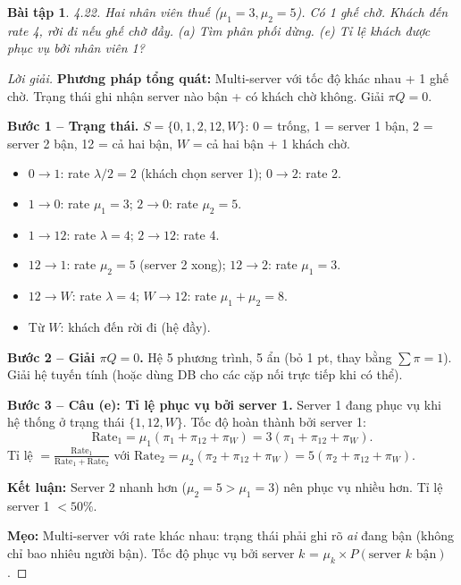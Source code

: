 \documentclass[8pt,a4paper]{article}
\newtheorem{exercise}{Bài tập}
\newenvironment{solution}{\begin{proof}[Lời giải]}{\end{proof}}
\begin{document}
\begin{exercise}
4.22. Hai nhân viên thuế ($\mu_1=3, \mu_2=5$). Có 1 ghế chờ. Khách đến rate 4, rời đi nếu ghế chờ đầy.
(a) Tìm phân phối dừng. (e) Tỉ lệ khách được phục vụ bởi nhân viên 1?
\end{exercise}
\begin{solution}
\textbf{Phương pháp tổng quát:} Multi-server với tốc độ khác nhau + 1 ghế chờ. Trạng thái ghi nhận server nào bận + có khách chờ không. Giải $\pi Q = 0$.

\textbf{Bước 1 -- Trạng thái.} $S = \{0, 1, 2, 12, W\}$: 0 = trống, 1 = server 1 bận, 2 = server 2 bận, 12 = cả hai bận, $W$ = cả hai bận + 1 khách chờ.
\begin{itemize}[nosep]
\item $0 \to 1$: rate $\lambda/2 = 2$ (khách chọn server 1); $0 \to 2$: rate 2.
\item $1 \to 0$: rate $\mu_1 = 3$; $2 \to 0$: rate $\mu_2 = 5$.
\item $1 \to 12$: rate $\lambda = 4$; $2 \to 12$: rate 4.
\item $12 \to 1$: rate $\mu_2 = 5$ (server 2 xong); $12 \to 2$: rate $\mu_1 = 3$.
\item $12 \to W$: rate $\lambda = 4$; $W \to 12$: rate $\mu_1 + \mu_2 = 8$.
\item Từ $W$: khách đến rời đi (hệ đầy).
\end{itemize}

\textbf{Bước 2 -- Giải $\pi Q = 0$.} Hệ 5 phương trình, 5 ẩn (bỏ 1 pt, thay bằng $\sum \pi = 1$).
Giải hệ tuyến tính (hoặc dùng DB cho các cặp nối trực tiếp khi có thể).

\textbf{Bước 3 -- Câu (e): Tỉ lệ phục vụ bởi server 1.}
Server 1 đang phục vụ khi hệ thống ở trạng thái $\{1, 12, W\}$. Tốc độ hoàn thành bởi server 1:
\[
\text{Rate}_1 = \mu_1(\pi_1 + \pi_{12} + \pi_W) = 3(\pi_1 + \pi_{12} + \pi_W).
\]
Tỉ lệ $= \frac{\text{Rate}_1}{\text{Rate}_1 + \text{Rate}_2}$ với $\text{Rate}_2 = \mu_2(\pi_2 + \pi_{12} + \pi_W) = 5(\pi_2 + \pi_{12} + \pi_W)$.

\textbf{Kết luận:} Server 2 nhanh hơn ($\mu_2 = 5 > \mu_1 = 3$) nên phục vụ nhiều hơn. Tỉ lệ server 1 $< 50\%$.

\textbf{Mẹo:} Multi-server với rate khác nhau: trạng thái phải ghi rõ \emph{ai} đang bận (không chỉ bao nhiêu người bận). Tốc độ phục vụ bởi server $k$ = $\mu_k \times P(\text{server } k \text{ bận})$.
\end{solution}
\end{document}
